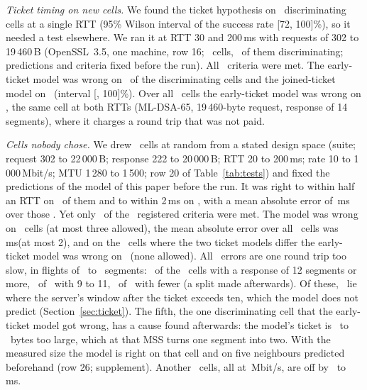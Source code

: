 \documentclass[sigconf,9pt,nonacm]{acmart}
\newcommand{\ms}{\,ms\xspace}
\begin{document}
\emph{Ticket timing on new cells.} We found the ticket hypothesis on \DDiff\ discriminating cells at a single RTT (95\% Wilson interval of the success rate [72, 100]\%), so it needed a test elsewhere. We ran it at RTT 30 and 200\ms with requests of 302 to 19\,460\,B (OpenSSL~3.5, one machine, row 16; \GtwelveCells\ cells, \GtwelveDis\ of them discriminating; predictions and criteria fixed before the run). All \GtwelveK\ criteria were met. The early-ticket model was wrong on \GtwelveEarlyDis\ of the discriminating cells and the joined-ticket model on \GtwelveJoinedDis\ (interval [\GtwelveWilsonLo, 100]\%). Over all \GtwelveCells\ cells the early-ticket model was wrong on \GtwelveEarlyAll, the same cell at both RTTs (ML-DSA-65, 19\,460-byte request, response of 14 segments), where it charges a round trip that was not paid.

\emph{Cells nobody chose.} We drew \GnineN\ cells at random from a stated design space (suite; request 302 to 22\,000\,B; response 222 to 20\,000\,B; RTT 20 to 200\ms; rate 10 to 1\,000\,Mbit/s; MTU 1\,280 to 1\,500; row 20 of Table~\ref{tab:tests}) and fixed the predictions of the model of this paper before the run. It was right to within half an RTT on \GnineOtherN\ of them and to within 2\ms on \GnineWithinTwo, with a mean absolute error of \GnineMaeOther\ms over those \GnineOtherN. Yet only \GnineMet\ of the \GnineK\ registered criteria were met. The model was wrong on \GnineWrongW\ cells (at most three allowed), the mean absolute error over all \GnineN\ cells was \GnineMae\ms (at most 2), and on the \GnineDisc\ cells where the two ticket models differ the early-ticket model was wrong on \GnineDiscEarlyW\ (none allowed). All \GnineWrongW\ errors are one round trip too slow, in flights of \GnineRespLo\ to \GnineRespHi\ segments: \GnineLargeWrongW\ of the \GnineLargeN\ cells with a response of 12 segments or more, \GnineMidWrongW\ of \GnineMidN\ with 9 to 11, \GnineSmallWrongW\ of \GnineSmallN\ with fewer (a split made afterwards). Of these, \TktWrongAfterW\ lie where the server's window after the ticket exceeds ten, which the model does not predict (Section~\ref{sec:ticket}). The fifth, the one discriminating cell that the early-ticket model got wrong, has a cause found afterwards: the model's ticket is \TktDiffLo\ to \TktDiffHi\ bytes too large, which at that MSS turns one segment into two. With the measured size the model is right on that cell and on five neighbours predicted beforehand (row 26; supplement). Another \GnineOffNW\ cells, all at \GnineOffRate\,Mbit/s, are off by \GnineOffLo\ to \GnineOffHi\ms.
\end{document}
